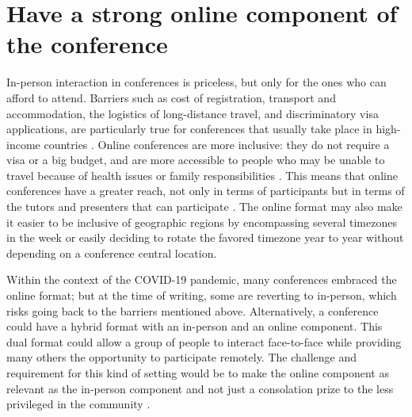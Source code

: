 \documentclass[10pt,letterpaper]{article}
\begin{document}
\section{Have a strong online component of the conference} 
\label{rule_online}

In-person interaction in conferences is priceless, but only for the ones who can afford to attend. 
Barriers such as cost of registration, transport and accommodation, the logistics of long-distance travel, and discriminatory visa applications, are particularly true for conferences that usually take place in high-income countries \cite{arendDisparityConferenceRegistration2019,gewinWhatScientistsShould2019,jooKeepOnlineOption2021}. 
Online conferences are more inclusive: they do not require a visa or a big budget, and are more accessible to people who may be unable to travel because of health issues or family responsibilities \cite{salibaGettingGripsOnline2020}.
This means that online conferences have a greater reach, not only in terms of participants but in terms of the tutors and presenters that can participate \cite{atkinsonJournalMedicine20202021, roosOnlineConferencesNew2020, jooKeepOnlineOption2021}.
The online format may also make it easier to be inclusive of geographic regions by encompassing several timezones in the week or easily deciding to rotate the favored timezone year to year without depending on a conference central location. 

Within the context of the COVID-19 pandemic, many conferences embraced the online format; but at the time of writing, some are reverting to in-person, which risks going back to the barriers mentioned above.
Alternatively, a conference could have a hybrid format with an in-person and an online component. This dual format could allow a group of people to interact face-to-face while providing many others the opportunity to participate remotely. 
The challenge and requirement for this kind of setting would be to make the online component as relevant as the in-person component and not just a consolation prize to the less privileged in the community \cite{ninerBetterWhomLeveling2021}.
\end{document}
